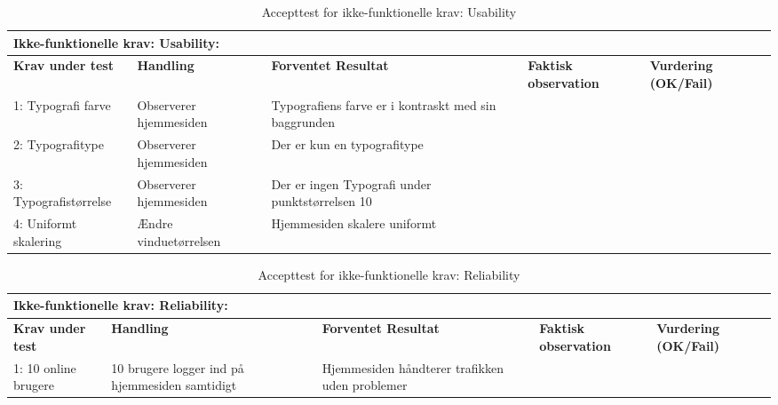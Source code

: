 \begin{table}[H] 
	\centering 
	\begin{tabular}{|p{3cm}|p{3cm}|p{3cm}|p{2cm}|p{2cm}|} %
		\toprule 	%
		\multicolumn{5}{|l|}{\textbf{Ikke-funktionelle krav: Usability:}}\\\midrule
			\textbf{Krav under test} & \textbf{Handling} & \textbf{Forventet Resultat} & \textbf{Faktisk observation} & \textbf{Vurdering (OK/Fail)} \\ \midrule 	%
		1: Typografi farve  & Observerer hjemmesiden  & Typografiens farve er i kontraskt med sin baggrunden &  &   \\ \hline
		2: Typografitype  & Observerer hjemmesiden  & Der er kun en typografitype  & &  \\ \hline
		3: Typografistørrelse  & Observerer hjemmesiden & Der er ingen Typografi under punktstørrelsen 10  & & \\ \hline
		4: Uniformt skalering  &  Ændre vinduetørrelsen  & Hjemmesiden skalere uniformt  & &  \\ \hline
\bottomrule
	\end{tabular} 
	\caption{Accepttest for ikke-funktionelle krav: Usability} 
	\label{tab:Accept_Use} 
\end{table}

\begin{table}[H] 
	\centering 
	\begin{tabular}{|p{3cm}|p{3cm}|p{3cm}|p{2cm}|p{2cm}|} %
		\toprule 	%
		\multicolumn{5}{|l|}{\textbf{Ikke-funktionelle krav: Reliability:}}\\\midrule
			\textbf{Krav under test} & \textbf{Handling} & \textbf{Forventet Resultat} & \textbf{Faktisk observation} & \textbf{Vurdering (OK/Fail)} \\ \midrule 	%
		1: 10 online brugere & 10 brugere logger ind på hjemmesiden samtidigt & Hjemmesiden håndterer trafikken uden problemer  & &  \\ \hline
\bottomrule
	\end{tabular} 
	\caption{Accepttest for ikke-funktionelle krav: Reliability} 
	\label{tab:Accept_rel} 
\end{table}

